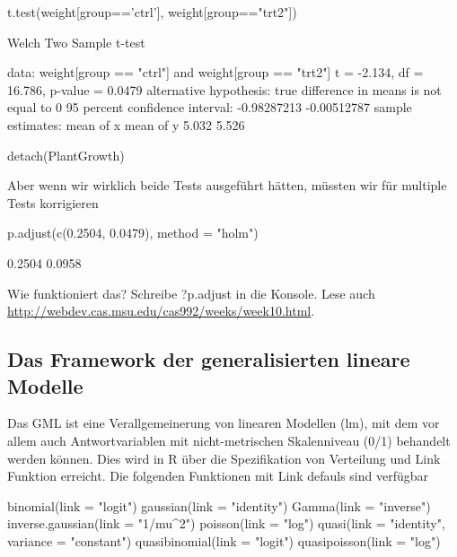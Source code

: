 \documentclass[a4paper,twoside]{tufte-book}\usepackage[]{graphicx}\usepackage[]{color}
\begin{document}
\begin{appendices}
\begin{Schunk}
\begin{Sinput}
t.test(weight[group=='ctrl'], weight[group=="trt2"])
\end{Sinput}
\begin{Soutput}

	Welch Two Sample t-test

data:  weight[group == "ctrl"] and weight[group == "trt2"]
t = -2.134, df = 16.786, p-value = 0.0479
alternative hypothesis: true difference in means is not equal to 0
95 percent confidence interval:
 -0.98287213 -0.00512787
sample estimates:
mean of x mean of y 
    5.032     5.526 
\end{Soutput}
\begin{Sinput}
detach(PlantGrowth)
\end{Sinput}
\end{Schunk}

Aber wenn wir wirklich beide Tests ausgeführt hätten, müssten wir für multiple Tests korrigieren

\begin{Schunk}
\begin{Sinput}
p.adjust(c(0.2504, 0.0479), method = "holm")
\end{Sinput}
\begin{Soutput}
[1] 0.2504 0.0958
\end{Soutput}
\end{Schunk}

Wie funktioniert das? Schreibe ?p.adjust in die Konsole. Lese auch \href{das hier}{http://webdev.cas.msu.edu/cas992/weeks/week10.html}.

\subsection{Das Framework der generalisierten lineare Modelle}

Das GML ist eine Verallgemeinerung von linearen Modellen (lm), mit dem vor allem auch Antwortvariablen mit nicht-metrischen Skalenniveau (0/1) behandelt werden können. Dies wird in R über die Spezifikation von Verteilung und Link Funktion erreicht. Die folgenden Funktionen mit Link defauls sind verfügbar

\begin{Schunk}
\begin{Sinput}
binomial(link = "logit")
gaussian(link = "identity")
Gamma(link = "inverse")
inverse.gaussian(link = "1/mu^2")
poisson(link = "log")
quasi(link = "identity", variance = "constant")
quasibinomial(link = "logit")
quasipoisson(link = "log")
\end{Sinput}
\end{Schunk}



\end{appendices}
\end{document}
